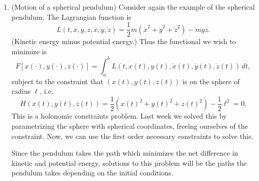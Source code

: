 \documentclass[11pt]{book}
\begin{document}
\begin{enumerate}
\item
(Motion of a spherical pendulum) Consider again the example of the spherical pendulum. The Lagrangian function is
\[
L(t, x,y,z, \dot{x}, \dot{y}, \dot{z}) = \frac{1}{2} m (\dot{x}^2 + \dot{y}^2 + \dot{z}^2) - mgz.
\]
(Kinetic energy minus potential energy.) Thus the functional we wish to minimize is
\[
F[x(\cdot), y(\cdot), z(\cdot)] = \int_a^b L(t, x(t), y(t), \dot{x}(t), \dot{y}(t), \dot{z}(t)) \, dt,
\]
subject to the constraint that $(x(t), y(t), z(t))$ is on the sphere of radius $\ell$, i.e.
\[
H(x(t), y(t), z(t)) = \frac{1}{2}(x(t)^2 + y(t)^2 + z(t)^2) - \frac{1}{2} \ell^2 = 0.
\]
This is a holonomic constraints problem. Last week we solved this by parametrizing the sphere with spherical coordinates, freeing ourselves of the constraint. Now, we can use the first order necessary constraints to solve this. 

Since the pendulum takes the path which minimizes the net difference in kinetic and potential energy, solutions to this problem will be the paths the pendulum takes depending on the initial conditions. 


\end{enumerate}
\end{document}
